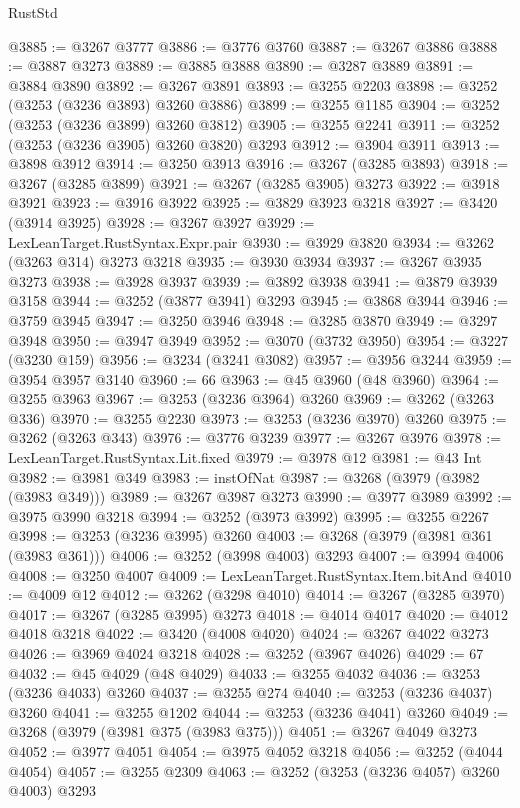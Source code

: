 \begin{lexlean}{RustStd}
\begin{coremodule}
@3885 := @3267 @3777
@3886 := @3776 @3760
@3887 := @3267 @3886
@3888 := @3887 @3273
@3889 := @3885 @3888
@3890 := @3287 @3889
@3891 := @3884 @3890
@3892 := @3267 @3891
@3893 := @3255 @2203
@3898 := @3252 (@3253 (@3236 @3893) @3260 @3886)
@3899 := @3255 @1185
@3904 := @3252 (@3253 (@3236 @3899) @3260 @3812)
@3905 := @3255 @2241
@3911 := @3252 (@3253 (@3236 @3905) @3260 @3820) @3293
@3912 := @3904 @3911
@3913 := @3898 @3912
@3914 := @3250 @3913
@3916 := @3267 (@3285 @3893)
@3918 := @3267 (@3285 @3899)
@3921 := @3267 (@3285 @3905) @3273
@3922 := @3918 @3921
@3923 := @3916 @3922
@3925 := @3829 @3923 @3218
@3927 := @3420 (@3914 @3925)
@3928 := @3267 @3927
@3929 := LexLeanTarget.RustSyntax.Expr.pair
@3930 := @3929 @3820
@3934 := @3262 (@3263 @314) @3273 @3218
@3935 := @3930 @3934
@3937 := @3267 @3935 @3273
@3938 := @3928 @3937
@3939 := @3892 @3938
@3941 := @3879 @3939 @3158
@3944 := @3252 (@3877 @3941) @3293
@3945 := @3868 @3944
@3946 := @3759 @3945
@3947 := @3250 @3946
@3948 := @3285 @3870
@3949 := @3297 @3948
@3950 := @3947 @3949
@3952 := @3070 (@3732 @3950)
@3954 := @3227 (@3230 @159)
@3956 := @3234 (@3241 @3082)
@3957 := @3956 @3244
@3959 := @3954 @3957 @3140
@3960 := 66
@3963 := @45 @3960 (@48 @3960)
@3964 := @3255 @3963
@3967 := @3253 (@3236 @3964) @3260
@3969 := @3262 (@3263 @336)
@3970 := @3255 @2230
@3973 := @3253 (@3236 @3970) @3260
@3975 := @3262 (@3263 @343)
@3976 := @3776 @3239
@3977 := @3267 @3976
@3978 := LexLeanTarget.RustSyntax.Lit.fixed
@3979 := @3978 @12
@3981 := @43 Int
@3982 := @3981 @349
@3983 := instOfNat
@3987 := @3268 (@3979 (@3982 (@3983 @349)))
@3989 := @3267 @3987 @3273
@3990 := @3977 @3989
@3992 := @3975 @3990 @3218
@3994 := @3252 (@3973 @3992)
@3995 := @3255 @2267
@3998 := @3253 (@3236 @3995) @3260
@4003 := @3268 (@3979 (@3981 @361 (@3983 @361)))
@4006 := @3252 (@3998 @4003) @3293
@4007 := @3994 @4006
@4008 := @3250 @4007
@4009 := LexLeanTarget.RustSyntax.Item.bitAnd
@4010 := @4009 @12
@4012 := @3262 (@3298 @4010)
@4014 := @3267 (@3285 @3970)
@4017 := @3267 (@3285 @3995) @3273
@4018 := @4014 @4017
@4020 := @4012 @4018 @3218
@4022 := @3420 (@4008 @4020)
@4024 := @3267 @4022 @3273
@4026 := @3969 @4024 @3218
@4028 := @3252 (@3967 @4026)
@4029 := 67
@4032 := @45 @4029 (@48 @4029)
@4033 := @3255 @4032
@4036 := @3253 (@3236 @4033) @3260
@4037 := @3255 @274
@4040 := @3253 (@3236 @4037) @3260
@4041 := @3255 @1202
@4044 := @3253 (@3236 @4041) @3260
@4049 := @3268 (@3979 (@3981 @375 (@3983 @375)))
@4051 := @3267 @4049 @3273
@4052 := @3977 @4051
@4054 := @3975 @4052 @3218
@4056 := @3252 (@4044 @4054)
@4057 := @3255 @2309
@4063 := @3252 (@3253 (@3236 @4057) @3260 @4003) @3293

\end{coremodule}
\end{lexlean}
